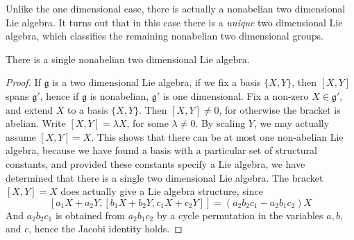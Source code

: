 Unlike the one dimensional case, there is actually a nonabelian two dimensional Lie algebra. It turns out that in this case there is a {\it unique} two dimensional Lie algebra, which classifies the remaining nonabelian two dimensional groups.

\begin{theorem}
    There is a single nonabelian two dimensional Lie algebra.
\end{theorem}
\begin{proof}
    If $\mathfrak{g}$ is a two dimensional Lie algebra, if we fix a basis $\{ X,Y \}$, then $[X,Y]$ spans $\mathfrak{g}'$, hence if $\mathfrak{g}$ is nonabelian, $\mathfrak{g}'$ is one dimensional. Fix a non-zero $X \in \mathfrak{g}'$, and extend $X$ to a basis $\{ X, Y \}$. Then $[X,Y] \neq 0$, for otherwise the bracket is abelian. Write $[X,Y] = \lambda X$, for some $\lambda \neq 0$. By scaling $Y$, we may actually assume $[X,Y] = X$. This shows that there can be at most one non-abelian Lie algebra, because we have found a basis with a particular set of structural constants, and provided these constants specify a Lie algebra, we have determined that there is a single two dimensional Lie algebra. The bracket $[X,Y] = X$ does actually give a Lie algebra structure, since
    \[ [a_1X + a_2Y, [b_1X + b_2Y, c_1X + c_2Y]] = (a_2b_2c_1 - a_2b_1c_2) X \]
    And $a_2b_2c_1$ is obtained from $a_2b_1c_2$ by a cycle permutation in the variables $a,b$, and $c$, hence the Jacobi identity holds.
\end{proof}

